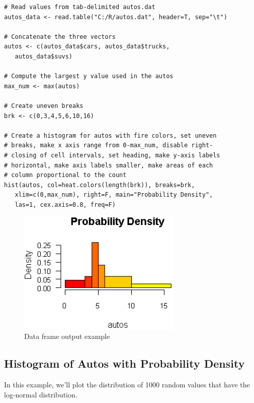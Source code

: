 \documentclass[10pt]{book}
\begin{document}
\begin{lstlisting}
# Read values from tab-delimited autos.dat
autos_data <- read.table("C:/R/autos.dat", header=T, sep="\t")

# Concatenate the three vectors
autos <- c(autos_data$cars, autos_data$trucks, 
   autos_data$suvs)

# Compute the largest y value used in the autos
max_num <- max(autos)

# Create uneven breaks
brk <- c(0,3,4,5,6,10,16)

# Create a histogram for autos with fire colors, set uneven
# breaks, make x axis range from 0-max_num, disable right-
# closing of cell intervals, set heading, make y-axis labels 
# horizontal, make axis labels smaller, make areas of each
# column proportional to the count
hist(autos, col=heat.colors(length(brk)), breaks=brk, 
   xlim=c(0,max_num), right=F, main="Probability Density", 
   las=1, cex.axis=0.8, freq=F)
\end{lstlisting}
\begin{figure}[H]
    \begin{flushleft}
        \includegraphics[width=0.7\textwidth]{hist_script4.png}
        \caption{Data frame output example}
        \label{fig:dataframe}
    \end{flushleft}
\end{figure}

\subsection*{Histogram of Autos with Probability Density}
In this example, we'll plot the distribution of 1000 random values that have the log-normal distribution.
\end{document}
